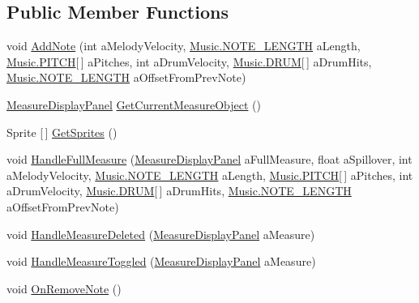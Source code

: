 \subsection*{Public Member Functions}
\begin{DoxyCompactItemize}
\item 
void \hyperlink{class_song_creation_1_1_note_display_container_aa8b087f8e218c3e08df5d5a85c952b2d}{Add\+Note} (int a\+Melody\+Velocity, \hyperlink{group___music_enums_gaf11b5f079adbb21c800b9eca1c5c3cbd}{Music.\+N\+O\+T\+E\+\_\+\+L\+E\+N\+G\+TH} a\+Length, \hyperlink{group___music_enums_ga508f69b199ea518f935486c990edac1d}{Music.\+P\+I\+T\+CH}\mbox{[}$\,$\mbox{]} a\+Pitches, int a\+Drum\+Velocity, \hyperlink{group___music_enums_gade475b4382c7066d1af13e7c13c029b6}{Music.\+D\+R\+UM}\mbox{[}$\,$\mbox{]} a\+Drum\+Hits, \hyperlink{group___music_enums_gaf11b5f079adbb21c800b9eca1c5c3cbd}{Music.\+N\+O\+T\+E\+\_\+\+L\+E\+N\+G\+TH} a\+Offset\+From\+Prev\+Note)
\item 
\hyperlink{class_song_creation_1_1_measure_display_panel}{Measure\+Display\+Panel} \hyperlink{class_song_creation_1_1_note_display_container_a72a72e35af39cad274edbf2acb6fbd2e}{Get\+Current\+Measure\+Object} ()
\item 
Sprite \mbox{[}$\,$\mbox{]} \hyperlink{class_song_creation_1_1_note_display_container_a7165497797fbeea51e1571c69c5f510c}{Get\+Sprites} ()
\item 
void \hyperlink{class_song_creation_1_1_note_display_container_a71314773e75bc3678c6f4078f1a222d1}{Handle\+Full\+Measure} (\hyperlink{class_song_creation_1_1_measure_display_panel}{Measure\+Display\+Panel} a\+Full\+Measure, float a\+Spillover, int a\+Melody\+Velocity, \hyperlink{group___music_enums_gaf11b5f079adbb21c800b9eca1c5c3cbd}{Music.\+N\+O\+T\+E\+\_\+\+L\+E\+N\+G\+TH} a\+Length, \hyperlink{group___music_enums_ga508f69b199ea518f935486c990edac1d}{Music.\+P\+I\+T\+CH}\mbox{[}$\,$\mbox{]} a\+Pitches, int a\+Drum\+Velocity, \hyperlink{group___music_enums_gade475b4382c7066d1af13e7c13c029b6}{Music.\+D\+R\+UM}\mbox{[}$\,$\mbox{]} a\+Drum\+Hits, \hyperlink{group___music_enums_gaf11b5f079adbb21c800b9eca1c5c3cbd}{Music.\+N\+O\+T\+E\+\_\+\+L\+E\+N\+G\+TH} a\+Offset\+From\+Prev\+Note)
\item 
void \hyperlink{class_song_creation_1_1_note_display_container_ae27c1c2674edd8a0918a561e082218d8}{Handle\+Measure\+Deleted} (\hyperlink{class_song_creation_1_1_measure_display_panel}{Measure\+Display\+Panel} a\+Measure)
\item 
void \hyperlink{class_song_creation_1_1_note_display_container_af7f99e611828e62a31947a5a4d474465}{Handle\+Measure\+Toggled} (\hyperlink{class_song_creation_1_1_measure_display_panel}{Measure\+Display\+Panel} a\+Measure)
\item 
void \hyperlink{class_song_creation_1_1_note_display_container_a5ab7823feaccccfd9c886c7210819640}{On\+Remove\+Note} ()
\end{DoxyCompactItemize}
